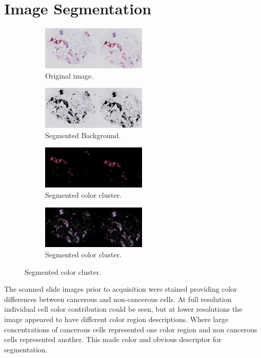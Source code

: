 \documentclass[letterpaper,10pt,oneside]{article}
\begin{document}

\section{Image Segmentation}
\begin{figure}[hbpt]
  \centering
  \begin{subfigure}{5cm}
    \includegraphics[width=5cm]{images/PO13-00516A1_1_7_201305171148_half.png}
    \caption{Original image.}
  \end{subfigure}
  \begin{subfigure}{5cm}
    \includegraphics[width=5cm]{images/PO13-00516A1_1_7_201305171148_cluster_1.png}
    \caption{Segmented Background.}
  \end{subfigure}
  \begin{subfigure}{5cm}
    \includegraphics[width=5cm]{images/PO13-00516A1_1_7_201305171148_cluster_2.png}
    \caption{Segmented color cluster.}
  \end{subfigure}
  \begin{subfigure}{5cm}
    \includegraphics[width=5cm]{images/PO13-00516A1_1_7_201305171148_cluster_3.png}
    \caption{Segmented color cluster.}
  \end{subfigure}
\end{figure}
The scanned slide images prior to acquisition were stained providing color differences between cancerous and non-cancerous cells. At full resolution individual cell color contribution could be seen, but at lower resolutions the image appeared to have different color region descriptions. Where large concentrations of cancerous cells represented one color region and non cancerous cells represented another. This made color and obvious descriptor for segmentation.
\end{document}

